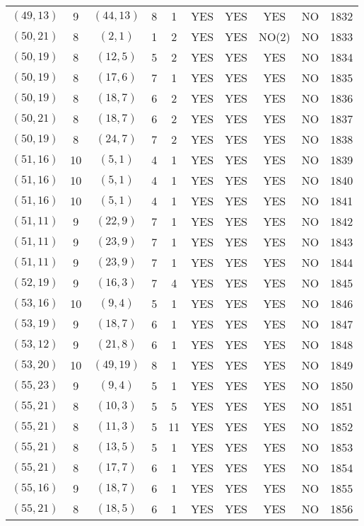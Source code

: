 \begin{longtable}{|c|c|c|c|c|c|c|c|c|c|}
$(49, 13)$ & 9 & $(44, 13)$ & 8 & 1 & YES & YES & YES & NO & 1832\\
$(50, 21)$ & 8 & $(2, 1)$ & 1 & 2 & YES & YES & NO(2) & NO & 1833\\
$(50, 19)$ & 8 & $(12, 5)$ & 5 & 2 & YES & YES & YES & NO & 1834\\
$(50, 19)$ & 8 & $(17, 6)$ & 7 & 1 & YES & YES & YES & NO & 1835\\
$(50, 19)$ & 8 & $(18, 7)$ & 6 & 2 & YES & YES & YES & NO & 1836\\
$(50, 21)$ & 8 & $(18, 7)$ & 6 & 2 & YES & YES & YES & NO & 1837\\
$(50, 19)$ & 8 & $(24, 7)$ & 7 & 2 & YES & YES & YES & NO & 1838\\
$(51, 16)$ & 10 & $(5, 1)$ & 4 & 1 & YES & YES & YES & NO & 1839\\
$(51, 16)$ & 10 & $(5, 1)$ & 4 & 1 & YES & YES & YES & NO & 1840\\
$(51, 16)$ & 10 & $(5, 1)$ & 4 & 1 & YES & YES & YES & NO & 1841\\
$(51, 11)$ & 9 & $(22, 9)$ & 7 & 1 & YES & YES & YES & NO & 1842\\
$(51, 11)$ & 9 & $(23, 9)$ & 7 & 1 & YES & YES & YES & NO & 1843\\
$(51, 11)$ & 9 & $(23, 9)$ & 7 & 1 & YES & YES & YES & NO & 1844\\
$(52, 19)$ & 9 & $(16, 3)$ & 7 & 4 & YES & YES & YES & NO & 1845\\
$(53, 16)$ & 10 & $(9, 4)$ & 5 & 1 & YES & YES & YES & NO & 1846\\
$(53, 19)$ & 9 & $(18, 7)$ & 6 & 1 & YES & YES & YES & NO & 1847\\
$(53, 12)$ & 9 & $(21, 8)$ & 6 & 1 & YES & YES & YES & NO & 1848\\
$(53, 20)$ & 10 & $(49, 19)$ & 8 & 1 & YES & YES & YES & NO & 1849\\
$(55, 23)$ & 9 & $(9, 4)$ & 5 & 1 & YES & YES & YES & NO & 1850\\
$(55, 21)$ & 8 & $(10, 3)$ & 5 & 5 & YES & YES & YES & NO & 1851\\
$(55, 21)$ & 8 & $(11, 3)$ & 5 & 11 & YES & YES & YES & NO & 1852\\
$(55, 21)$ & 8 & $(13, 5)$ & 5 & 1 & YES & YES & YES & NO & 1853\\
$(55, 21)$ & 8 & $(17, 7)$ & 6 & 1 & YES & YES & YES & NO & 1854\\
$(55, 16)$ & 9 & $(18, 7)$ & 6 & 1 & YES & YES & YES & NO & 1855\\
$(55, 21)$ & 8 & $(18, 5)$ & 6 & 1 & YES & YES & YES & NO & 1856\\

\end{longtable}
